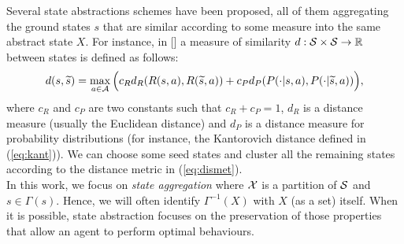 \newline
Several state abstractions schemes have been proposed, all of them aggregating the ground states $s$ that are similar according to some measure into the same abstract state $X$. For instance, in [\cite{ferns2012metrics}] a measure of similarity $d: \mathcal{S} \times \mathcal{S} \to \mathbb{R}$ between states is defined as follows:
\begin{align}
d(s, \widetilde{s}) = \max_{a \in \mathcal{A}} \Big( c_{R} d_{R}(R(s,a), R(\widetilde{s}, a)) + c_{P} d_{P}(P(\cdot|s, a), P(\cdot|\widetilde{s}, a)) \Big), \label{eq:dismet}
\end{align}
where $c_{R}$ and $c_{P}$ are two constants such that $c_{R} + c_{P} = 1$, $d_{R}$ is a distance measure (usually the Euclidean distance) and $d_{P}$ is a distance measure for probability distributions (for instance, the Kantorovich distance defined in (\ref{eq:kant})). We can choose some seed states and cluster all the remaining states according to the distance metric in (\ref{eq:dismet}).\\
\newline 
In this work, we focus on \textit{state aggregation} where $\mathcal{X}$ is a partition of $\mathcal{S}$ and $s\in\Gamma(s)$. Hence, we will often identify $\Gamma^{-1}(X)$ with $X$ (as a set) itself. When it is possible, state abstraction focuses on the preservation of those properties that allow an agent to perform optimal behaviours.
